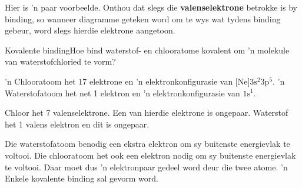
\label{m38704*id138991}Hier is 'n paar voorbeelde. Onthou dat slegs die \textbf{valenselektrone} betrokke is by binding, so wanneer diagramme geteken word om te wys wat tydens binding gebeur, word slegs hierdie elektrone aangetoon. \par 
\label{m38704*secfhsst!!!underscore!!!id98} 


\begin{wex}{Kovalente binding}{Hoe bind waterstof- en chlooratome  kovalent om  'n molekule van waterstofchloried te vorm?}
{
'n Chlooratoom het 17 elektrone en 'n elektronkonfigurasie van $\text{[Ne]}3\text{s}^{2}3\text{p}^{5}$.  'n Waterstofatoom het net 1 elektron en 'n elektronkonfigurasie van $1\text{s}^{1}$.


Chloor het 7 valenselektrone. Een van hierdie elektrone is ongepaar. Waterstof het 1 valens elektron en dit is ongepaar.

Die waterstofatoom benodig een ekstra elektron om sy buitenste energievlak te voltooi. Die chlooratoom het ook een elektron nodig om sy buitenste energievlak te voltooi. Daar moet dus  'n elektronpaar gedeel word deur die twee atome.  'n Enkele kovalente binding sal gevorm word.
\begin{figure}[H]
\begin{center}
\end{center}
\end{figure}}
\end{wex}
